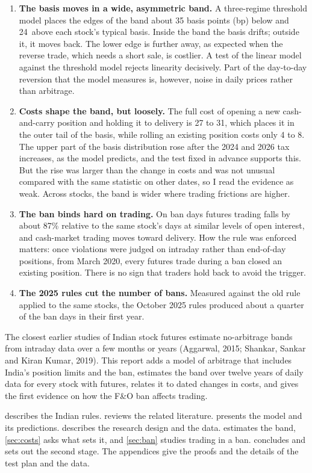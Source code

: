 \begin{enumerate}[leftmargin=1.4em,itemsep=3pt]
\item \textbf{The basis moves in a wide, asymmetric band.} A three-regime threshold model places the edges of the band
about 35 basis points (bp) below and 24\bp\ above each stock's typical basis. Inside the band the basis drifts; outside
it, it moves back. The lower edge is further away, as expected when the reverse trade, which needs a short sale, is
costlier. A test of the linear model against the threshold model rejects linearity decisively. Part of the day-to-day
reversion that the model measures is, however, noise in daily prices rather than arbitrage.
\item \textbf{Costs shape the band, but loosely.} The full cost of opening a new cash-and-carry position and holding it
to delivery is 27 to 31\bp, which places it in the outer tail of the basis, while rolling an existing position costs
only 4 to 8\bp. The upper part of the basis distribution rose after the 2024 and 2026 tax increases, as the model
predicts, and the test fixed in advance supports this. But the rise was larger than the change in costs and was not
unusual compared with the same statistic on other dates, so I read the evidence as weak. Across stocks, the band is
wider where trading frictions are higher.
\item \textbf{The ban binds hard on trading.} On ban days futures trading falls by about 87\% relative to the same
stock's days at similar levels of open interest, and cash-market trading moves toward delivery. How the rule was
enforced matters: once violations were judged on intraday rather than end-of-day positions, from March 2020, every
futures trade during a ban closed an existing position. There is no sign that traders hold back to avoid the trigger.
\item \textbf{The 2025 rules cut the number of bans.} Measured against the old rule applied to the same stocks, the
October 2025 rules produced about a quarter of the ban days in their first year.
\end{enumerate}

The closest earlier studies of Indian stock futures estimate no-arbitrage bands from intraday data over a few months
or years (Aggarwal, 2015; Shankar, Sankar and Kiran Kumar, 2019). This report adds a model of arbitrage that includes
India's position limits and the ban, estimates the band over twelve years of daily data for every stock with futures,
relates it to dated changes in costs, and gives the first evidence on how the F\&O ban affects trading.

 describes the Indian rules.  reviews the related literature.  presents
the model and its predictions.  describes the research design and the data.  estimates the
band, \cref{sec:costs} asks what sets it, and \cref{sec:ban} studies trading in a ban.  concludes
and sets out the second stage. The appendices give the proofs and the details of the test plan and the data.
